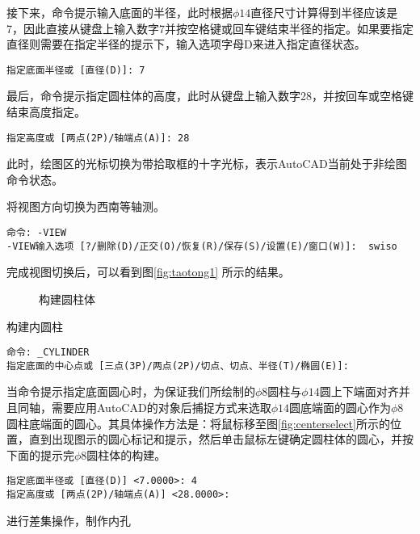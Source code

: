 \begin{procedure}
接下来，命令提示输入底面的半径，此时根据$\phi 14$直径尺寸计算得到半径应该是7，因此直接从键盘上输入数字7并按空格键或回车键结束半径的指定。如果要指定直径则需要在指定半径的提示下，输入选项字母D来进入指定直径状态。
\begin{lstlisting}
指定底面半径或 [直径(D)]: 7
\end{lstlisting}
最后，命令提示指定圆柱体的高度，此时从键盘上输入数字28，并按回车或空格键结束高度指定。
\begin{lstlisting}
指定高度或 [两点(2P)/轴端点(A)]: 28
\end{lstlisting}
此时，绘图区的光标切换为带拾取框的十字光标，表示AutoCAD当前处于非绘图命令状态。
\item 将视图方向切换为西南等轴测。
\begin{lstlisting}
命令: -VIEW
-VIEW输入选项 [?/删除(D)/正交(O)/恢复(R)/保存(S)/设置(E)/窗口(W)]:  swiso
\end{lstlisting}
完成视图切换后，可以看到图\ref{fig:taotong1} 所示的结果。
\begin{figure}[htbp]
\centering
{}\hspace{20pt}
\hspace{20pt}
\caption{构建圆柱体}
\end{figure}

\item 构建内圆柱
\begin{lstlisting}
命令: _CYLINDER
指定底面的中心点或 [三点(3P)/两点(2P)/切点、切点、半径(T)/椭圆(E)]:
\end{lstlisting}
当命令提示指定底面圆心时，为保证我们所绘制的$\phi 8$圆柱与$\phi 14$圆上下端面对齐并且同轴，需要应用AutoCAD的对象后捕捉方式来选取$\phi 14$圆底端面的圆心作为$\phi 8$圆柱底端面的圆心。其具体操作方法是：将鼠标移至图\ref{fig:centerselect}所示的位置，直到出现图示的圆心标记和提示，然后单击鼠标左键确定圆柱体的圆心，并按下面的提示完$\phi 8$圆柱体的构建。
\begin{lstlisting}
指定底面半径或 [直径(D)] <7.0000>: 4
指定高度或 [两点(2P)/轴端点(A)] <28.0000>:
\end{lstlisting}


\item 进行差集操作，制作内孔


\end{procedure}
